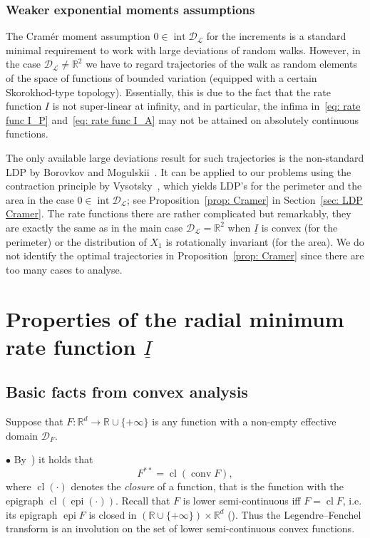 \documentclass[10pt]{amsart}
\theoremstyle{definition}\newtheorem{defi}[theo]{Definition}\newtheorem{rema}[theo]{Remark}\newtheorem{exam}[theo]{Example}\newtheorem{exem}[theo]{Example}\newtheorem{nota}[theo]{Notation}
\DeclareMathOperator{\conv}{conv}
\DeclareMathOperator{\cl}{cl}
\DeclareMathOperator{\intr}{int}
\DeclareMathOperator{\epi}{epi}
\newcommand{\ubar}[1]{\underline{#1}}
\newcommand{\Rbb}{\mathbb{R}}
\newcommand{\Dcl}{\mathcal{D}}
\newcommand{\Lcl}{\mathcal{L}}
\begin{document}
\subsubsection{Weaker exponential moments assumptions}
The Cram\'er moment assumption $0 \in \intr \Dcl_{\Lcl}$ for the increments is a standard minimal requirement to work with large deviations of random walks. However, in the case $\Dcl_{\Lcl} \neq \Rbb^2$ we have to regard trajectories of the walk as random elements of the space of functions of bounded variation (equipped with a certain Skorokhod-type topology). Essentially, this is due to the fact that the rate function $I$ is not super-linear at infinity, and in particular, the infima in~\eqref{eq: rate func I_P} and~\eqref{eq: rate func I_A} may not be attained on absolutely continuous functions.

The only available large deviations result for such trajectories is the non-standard LDP by Borovkov and Mogulskii~\cite{BorovkovMogulskii2}. It can be applied to our problems using the contraction principle by Vysotsky~\cite{VysotskyNote}, which yields LDP's for the perimeter and the area in the case $0 \in \intr \Dcl_{\Lcl}$; see Proposition~\ref{prop: Cramer} in Section~\ref{sec: LDP Cramer}. The rate functions there are rather complicated but remarkably, they are exactly the same as in the main case $\Dcl_{\Lcl} = \Rbb^2$ when $\ubar I$ is convex (for the perimeter) or the distribution of $X_1$ is rotationally invariant (for the area). We do not identify the optimal trajectories in Proposition~\ref{prop: Cramer} since there are too many cases to analyse.

\section{Properties of the radial minimum rate function \texorpdfstring{$\ubar I$}{ubar I}} \label{Sec Convex}
\subsection{Basic facts from convex analysis} \label{Sec Convex basics}
Suppose that $F: \Rbb^d \to \Rbb \cup \{+\infty \}$ is any function with a non-empty effective domain $\Dcl_F$.


$\bullet$ By~\cite[Theorem~12.2 and Corollary~12.1.1]{Rockafellar}) it holds that
\begin{equation}\label{eq: involution}
F^{**}= \cl (\conv F),
\end{equation}
where $\cl (\cdot)$ denotes the \emph{closure} of a function, that is the function with the epigraph $\cl (\epi (\cdot))$. Recall that $F$ is lower semi-continuous iff $F = \cl F$, i.e. its epigraph $\epi F$ is closed in $(\Rbb \cup \{+\infty\})\times \Rbb^d$ (\cite[Theorem~7.1]{Rockafellar}). Thus the Legendre--Fenchel transform is an involution on the set of lower semi-continuous convex functions.
\end{document}
